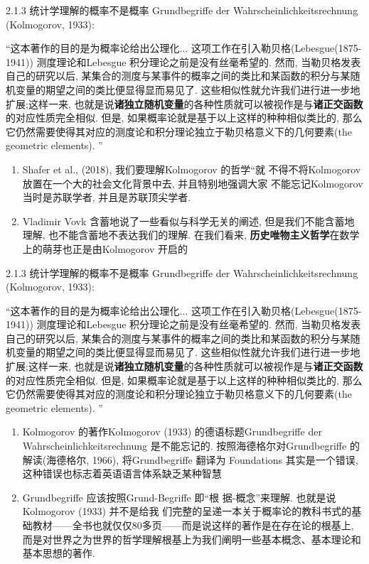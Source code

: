 \documentclass[compress,10pt,dvipsnames,notheorems]{beamer} %
\begin{document}
\begin{frame}{2.1.3 统计学理解的概率不是概率}
Grundbegriffe der Wahrscheinlichkeitsrechnung (Kolmogorov, 1933):

\begin{solu}
“这本著作的目的是为概率论给出公理化... 这项工作在引入勒贝格(Lebesgue(1875-1941)) 测度理论和Lebesgue 积分理论之前是没有丝毫希望的. 然而, 当勒贝格发表自己的研究以后, 某集合的测度与某事件的概率之间的类比和某函数的积分与某随机变量的期望之间的类比便显得显而易见了. 这些相似性就允许我们进行进一步地扩展;这样一来, 也就是说\textbf{诸独立随机变量}的各种性质就可以被视作是与\textbf{诸正交函数}的对应性质完全相似. 但是, 如果概率论就是基于以上这样的种种相似类比的, 那么它仍然需要使得其对应的测度论和积分理论独立于勒贝格意义下的几何要素(the geometric elements). ”
\end{solu}
\begin{enumerate}
\item Shafer et al., (2018), 我们要理解Kolmogorov 的哲学“就
不得不将Kolmogorov 放置在一个大的社会文化背景中去, 并且特别地强调大家
不能忘记Kolmogorov 当时是苏联学者, 并且是苏联顶尖学者. 
\item Vladimir Vovk 含蓄地说了一些看似与科学无关的阐述, 但是我们不能含蓄地理解, 也不能含蓄地不表达我们的理解. 在我们看来, \textbf{历史唯物主义哲学}在数学上的萌芽也正是由Kolmogorov 开启的
\end{enumerate}
\end{frame}

\begin{frame}{2.1.3 统计学理解的概率不是概率}
Grundbegriffe der Wahrscheinlichkeitsrechnung (Kolmogorov, 1933):

\begin{solu}
“这本著作的目的是为概率论给出公理化... 这项工作在引入勒贝格(Lebesgue(1875-1941)) 测度理论和Lebesgue 积分理论之前是没有丝毫希望的. 然而, 当勒贝格发表自己的研究以后, 某集合的测度与某事件的概率之间的类比和某函数的积分与某随机变量的期望之间的类比便显得显而易见了. 这些相似性就允许我们进行进一步地扩展;这样一来, 也就是说\textbf{诸独立随机变量}的各种性质就可以被视作是与\textbf{诸正交函数}的对应性质完全相似. 但是, 如果概率论就是基于以上这样的种种相似类比的, 那么它仍然需要使得其对应的测度论和积分理论独立于勒贝格意义下的几何要素(the geometric elements). ”
\end{solu}
\begin{enumerate}
\item Kolmogorov 的著作Kolmogorov
(1933) 的德语标题Grundbegriffe der Wahrscheinlichkeitsrechnung 是不能忘记的. 按照海德格尔对Grundbegriffe 的解读(海德格尔, 1966), 将Grundbegriffe 翻译为 Foundations 其实是一个错误, 这种错误也标志着英语语言体系缺乏某种智慧
\item Grundbegriffe 应该按照Grund-Begriffe 即“根
据-概念”来理解. 也就是说Kolmogorov (1933) 并不是给我
们完整的呈递一本关于概率论的教科书式的基础教材——全书也就仅仅80多页——而是说这样的著作是在存在论的根基上, 而是对世界之为世界的哲学理解根基上为我们阐明一些基本概念、基本理论和基本思想的著作.
\end{enumerate}
\end{frame}
\end{document}
